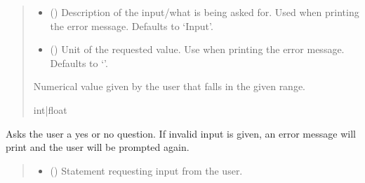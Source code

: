 \documentclass[letterpaper,10pt,english]{sphinxmanual}
\begin{document}
\begin{fulllineitems}
\begin{fulllineitems}
\begin{quote}
\begin{description}
\begin{itemize}
\item {} 
\sphinxAtStartPar
{} (\sphinxstyleliteralemphasis{\sphinxupquote{, }}) \textendash{} Description of the input/what is being asked for. Used when printing                 the error message. Defaults to ‘Input’.

\item {} 
\sphinxAtStartPar
{} (\sphinxstyleliteralemphasis{\sphinxupquote{, }}) \textendash{} Unit of the requested value. Use when printing the error message.                 Defaults to ‘’.

\end{itemize}

\sphinxAtStartPar
Numerical value given by the user that falls in the given range.

\sphinxAtStartPar
int|float

\end{description}\end{quote}

\end{fulllineitems}


\begin{fulllineitems}
\label{\detokenize{GetUserInput:GetUserInput.UserInput.AskYN}}
\pysigstartsignatures
{}
\pysigstopsignatures
\sphinxAtStartPar
Asks the user a yes or no question. If invalid input is given, an error message will print and         the user will be prompted again.
\begin{quote}\begin{description}
\begin{itemize}
\item {} 
\sphinxAtStartPar
{} () \textendash{} Statement requesting input from the user.


\end{itemize}
\end{description}
\end{quote}
\end{fulllineitems}
\end{fulllineitems}
\end{document}
